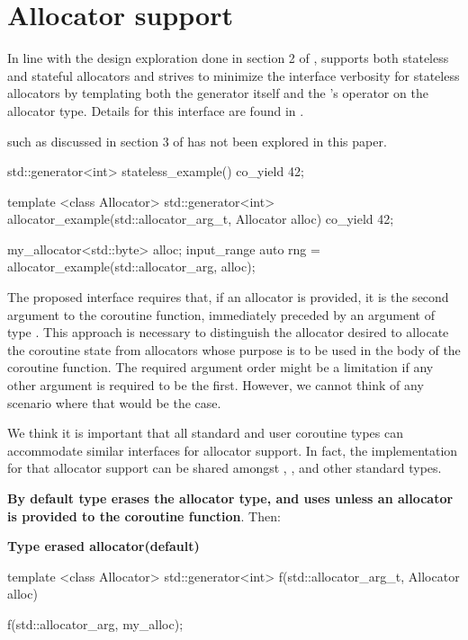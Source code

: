 \documentclass{wg21}
\begin{document}
\section{Allocator support}

In line with the design exploration done in section 2 of ,  supports both stateless and stateful allocators and strives to minimize the interface verbosity for stateless allocators by templating both the generator itself and the 's  operator
on the allocator type. Details for this interface are found in .

 such as discussed in section 3 of  has not been explored in this paper.

\begin{colorblock}
    std::generator<int> stateless_example() {
        co_yield 42;
    }

    template <class Allocator>
    std::generator<int> allocator_example(std::allocator_arg_t, Allocator alloc) {
        co_yield 42;
    }

    my_allocator<std::byte> alloc;
    input_range auto rng = allocator_example(std::allocator_arg, alloc);
\end{colorblock}

The proposed interface requires that, if an allocator is provided, it is the second argument to the coroutine function,
immediately preceded by an argument of type .
This approach is necessary to distinguish the allocator desired to allocate the coroutine state from allocators whose purpose is to be used in the body of the coroutine function.
The required argument order might be a limitation if any other argument is required to be the first. However, we cannot think of any scenario where that would be the case.

We think it is important that all standard and user coroutine types can accommodate similar interfaces for allocator support.
In fact, the implementation for that allocator support can be shared amongst , , and other standard types.

\textbf{By default  type erases the allocator type, and uses  unless an allocator is provided to
the coroutine function}.
Then:

\textbf{Type erased allocator(default)}

\begin{colorblock}
template <class Allocator>
std::generator<int> f(std::allocator_arg_t, Allocator alloc) {}

f(std::allocator_arg, my_alloc{});
\end{colorblock}
\end{document}
